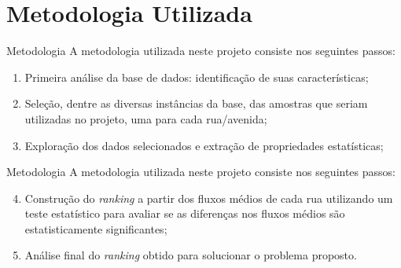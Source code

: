 \section{Metodologia Utilizada}

\begin{frame}{Metodologia}
	A metodologia utilizada neste projeto consiste nos seguintes passos:
    \vskip 0.2cm
    \begin{enumerate}
    \item Primeira análise da base de dados: identificação de suas características;
    \item Seleção, dentre as diversas instâncias da base, das amostras que seriam
    utilizadas no projeto, uma para cada rua/avenida;
    \item Exploração dos dados selecionados e extração de propriedades estatísticas;
    \end{enumerate}
\end{frame}

\begin{frame}{Metodologia}
	A metodologia utilizada neste projeto consiste nos seguintes passos:
    \vskip 0.2cm
    \begin{enumerate}
    \setcounter{enumi}{3}
    \item Construção do \textit{ranking} a partir dos fluxos médios de cada rua utilizando
    um teste estatístico para avaliar se as diferenças nos fluxos médios são
    estatisticamente significantes;
    \item Análise final do \textit{ranking} obtido para solucionar o problema proposto.
    \end{enumerate}
\end{frame}
